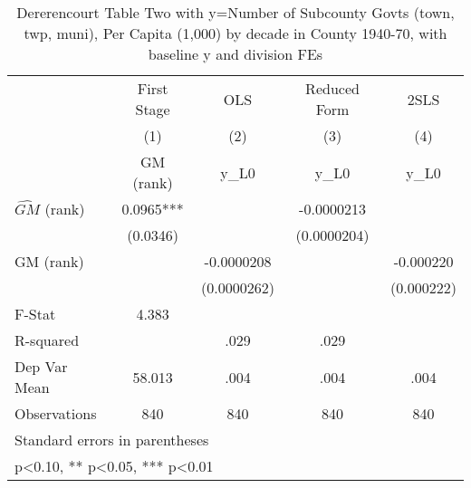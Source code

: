 \begin{table}[htbp]\centering
\def\sym#1{\ifmmode^{#1}\else\(^{#1}\)\fi}
\caption{Dererencourt Table Two with y=Number of Subcounty Govts (town, twp, muni), Per Capita (1,000) by decade in County 1940-70, with baseline y and division FEs}
\begin{tabular}{l*{4}{c}}
\toprule
                    & First Stage   &         OLS   &Reduced Form   &        2SLS   \\
                    &\multicolumn{1}{c}{(1)}&\multicolumn{1}{c}{(2)}&\multicolumn{1}{c}{(3)}&\multicolumn{1}{c}{(4)}\\
                    &\multicolumn{1}{c}{GM  (rank)}&\multicolumn{1}{c}{y\_L0}&\multicolumn{1}{c}{y\_L0}&\multicolumn{1}{c}{y\_L0}\\
\midrule
$\hat{GM}$ (rank)   &      0.0965***&               &  -0.0000213   &               \\
                    &    (0.0346)   &               & (0.0000204)   &               \\
\addlinespace
GM  (rank)          &               &  -0.0000208   &               &   -0.000220   \\
                    &               & (0.0000262)   &               &  (0.000222)   \\
\midrule
F-Stat              &       4.383   &               &               &               \\
R-squared           &               &        .029   &        .029   &               \\
Dep Var Mean        &      58.013   &        .004   &        .004   &        .004   \\
Observations        &         840   &         840   &         840   &         840   \\
\bottomrule
\multicolumn{5}{l}{\footnotesize Standard errors in parentheses}\\
\multicolumn{5}{l}{\footnotesize * p<0.10, ** p<0.05, *** p<0.01}\\
\end{tabular}
\end{table}
